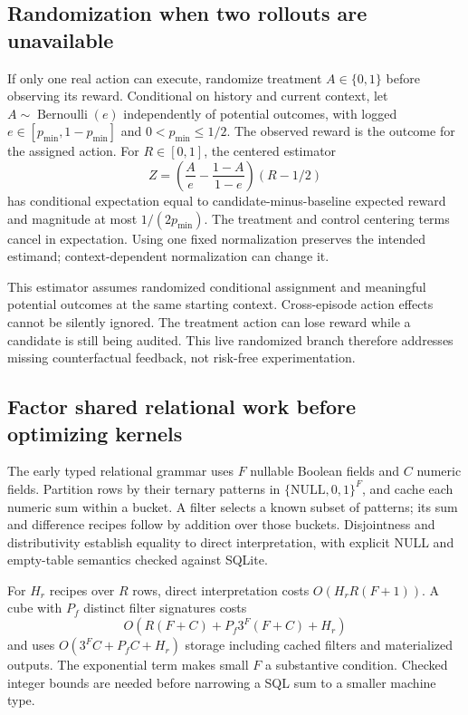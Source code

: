 \documentclass[10pt,twocolumn]{article}
\begin{document}
\subsection{Randomization when two rollouts are unavailable}
If only one real action can execute, randomize treatment $A\in\{0,1\}$ before
observing its reward. Conditional on history and current context, let
$A\sim\operatorname{Bernoulli}(e)$ independently of potential outcomes, with
logged $e\in[p_{\min},1-p_{\min}]$ and $0<p_{\min}\leq1/2$. The observed
reward is the outcome for the assigned action. For $R\in[0,1]$, the centered estimator
\begin{equation}
 Z=\left(\frac{A}{e}-\frac{1-A}{1-e}\right)(R-1/2)
\end{equation}
has conditional expectation equal to candidate-minus-baseline expected reward
and magnitude at most $1/(2p_{\min})$. The treatment and control centering terms
cancel in expectation. Using one fixed normalization preserves the intended
estimand; context-dependent normalization can change it.

This estimator assumes randomized conditional assignment and meaningful
potential outcomes at the same starting context. Cross-episode action effects cannot be
silently ignored. The treatment action can lose reward while a candidate is
still being audited. This live randomized branch therefore addresses missing
counterfactual feedback, not risk-free experimentation.

\subsection{Factor shared relational work before optimizing kernels}
The early typed relational grammar uses $F$ nullable Boolean fields and $C$
numeric fields. Partition rows by their ternary patterns in
$\{\mathrm{NULL},0,1\}^F$, and cache each numeric sum within a bucket. A filter
selects a known subset of patterns; its sum and difference recipes follow by
addition over those buckets. Disjointness and distributivity establish equality
to direct interpretation, with explicit NULL and empty-table semantics checked
against SQLite.

For $H_r$ recipes over $R$ rows, direct interpretation costs
$O(H_rR(F+1))$. A cube with $P_f$ distinct filter signatures costs
\begin{equation}
 O\!\left(R(F+C)+P_f3^F(F+C)+H_r\right)
\end{equation}
and uses $O(3^FC+P_fC+H_r)$ storage including cached filters and materialized
outputs. The exponential term makes small $F$ a substantive condition. Checked
integer bounds are needed before narrowing a SQL sum to a smaller machine type.
\end{document}
